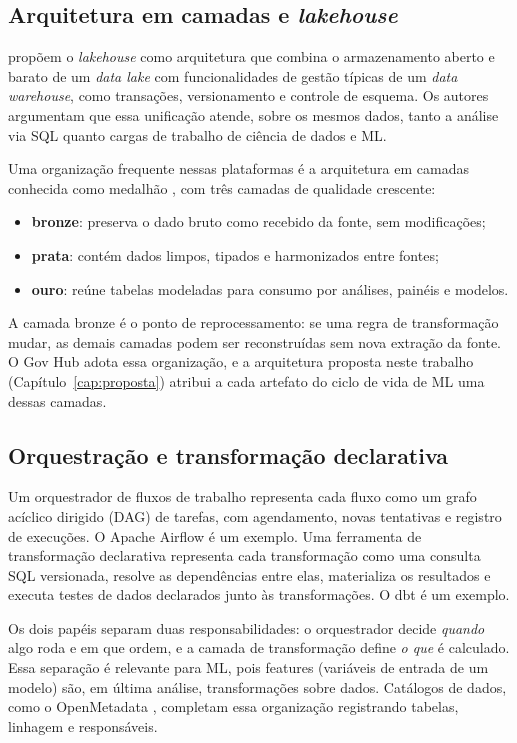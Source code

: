 \subsection{Arquitetura em camadas e \textit{lakehouse}}

 propõem o \textit{lakehouse} como arquitetura que combina o armazenamento aberto e barato de um \textit{data lake} com funcionalidades de gestão típicas de um \textit{data warehouse}, como transações, versionamento e controle de esquema. Os autores argumentam que essa unificação atende, sobre os mesmos dados, tanto a análise via SQL quanto cargas de trabalho de ciência de dados e ML.

Uma organização frequente nessas plataformas é a arquitetura em camadas conhecida como medalhão \cite{databricks2023mlops}, com três camadas de qualidade crescente:

\begin{itemize}
	\item \textbf{bronze}: preserva o dado bruto como recebido da fonte, sem modificações;
	\item \textbf{prata}: contém dados limpos, tipados e harmonizados entre fontes;
	\item \textbf{ouro}: reúne tabelas modeladas para consumo por análises, painéis e modelos.
\end{itemize}

A camada bronze é o ponto de reprocessamento: se uma regra de transformação mudar, as demais camadas podem ser reconstruídas sem nova extração da fonte. O Gov Hub adota essa organização, e a arquitetura proposta neste trabalho (Capítulo~\ref{cap:proposta}) atribui a cada artefato do ciclo de vida de ML uma dessas camadas.

\subsection{Orquestração e transformação declarativa}

Um orquestrador de fluxos de trabalho representa cada fluxo como um grafo acíclico dirigido (DAG) de tarefas, com agendamento, novas tentativas e registro de execuções. O Apache Airflow \cite{airflow} é um exemplo. Uma ferramenta de transformação declarativa representa cada transformação como uma consulta SQL versionada, resolve as dependências entre elas, materializa os resultados e executa testes de dados declarados junto às transformações. O dbt \cite{dbt} é um exemplo.

Os dois papéis separam duas responsabilidades: o orquestrador decide \emph{quando} algo roda e em que ordem, e a camada de transformação define \emph{o que} é calculado. Essa separação é relevante para ML, pois features (variáveis de entrada de um modelo) são, em última análise, transformações sobre dados. Catálogos de dados, como o OpenMetadata \cite{openmetadata}, completam essa organização registrando tabelas, linhagem e responsáveis.

